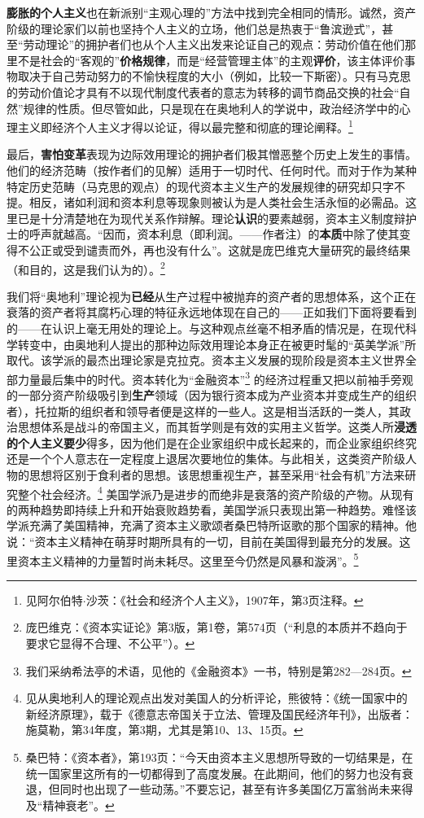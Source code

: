 \documentclass[fontset=fandol, a4paper, 12pt, openright]{ctexbook}
\begin{document}
\textbf{膨胀的个人主义}也在新派别“主观心理的”方法中找到完全相同的情形。诚然，资产阶级的理论家们以前也坚持个人主义的立场，他们总是热衷于“鲁滨逊式”，甚至“劳动理论”的拥护者们也从个人主义出发来论证自己的观点：劳动价值在他们那里不是社会的“客观的”\textbf{价格规律}，而是“经营管理主体”的主观\textbf{评价}，该主体评价事物取决于自己劳动努力的不愉快程度的大小（例如，比较一下斯密）。只有马克思的劳动价值论才具有不以现代制度代表者的意志为转移的调节商品交换的社会“自然”规律的性质。但尽管如此，只是现在在奥地利人的学说中，政治经济学中的心理主义即经济个人主义才得以论证，得以最完整和彻底的理论阐释。\footnote{见阿尔伯特$\cdot$沙茨：《社会和经济个人主义》，1907年，第3页注释。}

最后，\textbf{害怕变革}表现为边际效用理论的拥护者们极其憎恶整个历史上发生的事情。他们的经济范畴（按作者们的见解）适用于一切时代、任何时代。而对于作为某种特定历史范畴（马克思的观点）的现代资本主义生产的发展规律的研究却只字不提。相反，诸如利润和资本利息等现象则被认为是人类社会生活永恒的必需品。这里已是十分清楚地在为现代关系作辩解。理论\textbf{认识}的要素越弱，资本主义制度辩护士的呼声就越高。“因而，资本利息（即利润。——作者注）的\textbf{本质}中除了使其变得不公正或受到谴责而外，再也没有什么”。这就是庞巴维克大量研究的最终结果（和目的，这是我们认为的）。\footnote{庞巴维克：《资本实证论》第3版，第1卷，第574页（“利息的本质并不趋向于要求它显得不合理、不公平”）。}

我们将“奥地利”理论视为\textbf{已经}从生产过程中被抛弃的资产者的思想体系，这个正在衰落的资产者将其腐朽心理的特征永远地体现在自己的——正如我们下面将要看到的——在认识上毫无用处的理论上。与这种观点丝毫不相矛盾的情况是，在现代科学转变中，由奥地利人提出的那种边际效用理论本身正在被更时髦的“英美学派”所取代。该学派的最杰出理论家是克拉克。资本主义发展的现阶段是资本主义世界全部力量最后集中的时代。资本转化为“金融资本”\footnote{我们采纳希法亭的术语，见他的《金融资本》一书，特别是第282—284页。} 的经济过程重又把以前袖手旁观的一部分资产阶级吸引到\textbf{生产}领域（因为银行资本成为产业资本并变成生产的组织者），托拉斯的组织者和领导者便是这样的一些人。这是相当活跃的一类人，其政治思想体系是战斗的帝国主义，而其哲学则是有效的实用主义哲学。这类人所\textbf{浸透的个人主义要少}得多，因为他们是在企业家组织中成长起来的，而企业家组织终究还是一个个人意志在一定程度上退居次要地位的集体。与此相关，这类资产阶级人物的思想将区别于食利者的思想。该思想重视生产，甚至采用“社会有机”方法来研究整个社会经济。\footnote{见从奥地利人的理论观点出发对美国人的分析评论，熊彼特：《统一国家中的新经济原理》，载于《德意志帝国关于立法、管理及国民经济年刊》，出版者：施莫勒，第34年度，第3期，尤其是第10、13、15页。} 美国学派乃是进步的而绝非是衰落的资产阶级的产物。从现有的两种趋势即持续上升和开始衰败趋势看，美国学派只表现出第一种趋势。难怪该学派充满了美国精神，充满了资本主义歌颂者桑巴特所讴歌的那个国家的精神。他说：“资本主义精神在萌芽时期所具有的一切，目前在美国得到最充分的发展。这里资本主义精神的力量暂时尚未耗尽。这里至今仍然是风暴和漩涡”。\footnote{桑巴特：《资本者》，第193页：“今天由资本主义思想所导致的一切结果是，在统一国家里这所有的一切都得到了高度发展。在此期间，他们的努力也没有衰退，但同时也出现了一些动荡。”不要忘记，甚至有许多美国亿万富翁尚未来得及“精神衰老”。}
\end{document}
